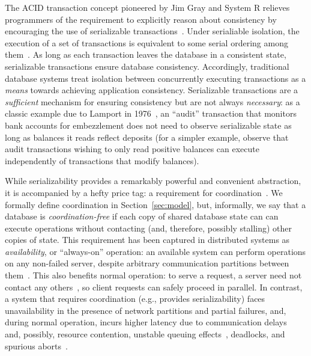 
 The ACID transaction concept
pioneered by Jim Gray and System R relieves programmers of the
requirement to explicitly reason about consistency by encouraging the
use of serializable transactions~\cite{gray-virtues}. Under
serialiable isolation, the execution of a set of transactions is
equivalent to some serial ordering among
them~\cite{bernstein-book}. As long as each transaction leaves the
database in a consistent state, serializable transactions ensure
database consistency. Accordingly, traditional database systems treat
isolation between concurrently executing transactions as a
\textit{means} towards achieving application consistency. Serializable
transactions are a \textit{sufficient} mechanism for ensuring
consistency but are not always \textit{necessary}: as a classic
example due to Lamport in 1976~\cite{lamport-audit}, an ``audit''
transaction that monitors bank accounts for embezzlement does not need
to observe serializable state as long as balances it reads reflect
deposits (for a simpler example, observe that audit transactions
wishing to only read positive balances can execute independently of
transactions that modify balances).


 While serializability provides a
remarkably powerful and convenient abstraction, it is accompanied by a
hefty price tag: a requirement for
coordination~\cite{davidson-survey}. We formally define coordination
in Section~\ref{sec:model}, but, informally, we say that a database is
\textit{coordination-free} if each copy of shared database state can
can execute operations without contacting (and, therefore, possibly
stalling) other copies of state. This requirement has been captured in
distributed systems as \textit{availability}, or ``always-on''
operation: an available system can perform operations on any
non-failed server, despite arbitrary communication partitions between
them~\cite{gilbert-cap}. This also benefits normal operation: to serve
a request, a \cfree server need not contact any others~\cite{pacelc},
so client requests can safely proceed in parallel. In contrast, a
system that requires coordination (e.g., provides serializability)
faces unavailability in the presence of network partitions and partial
failures, and, during normal operation, incurs higher latency due to
communication delays~\cite{hat-vldb} and, possibly, resource
contention, unstable queuing effects~\cite{ladis}, deadlocks, and
spurious aborts~\cite{bernstein-book,gray-virtues}.

